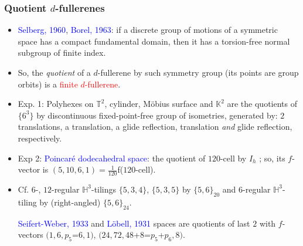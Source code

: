 \documentclass{beamer}
\begin{document}
\begin{frame}\frametitle{Quotient $d$-fullerenes}
\begin{itemize}
\vspace{-2mm}
\item
\textcolor{blue}{Selberg, 1960}, \textcolor{blue}{Borel, 1963}: if a discrete group of 
motions of
a symmetric space has a compact fundamental domain, then it has a torsion-free
normal subgroup of finite index.
\item
So, the {\em quotient}  of a $d$-fullerene by 
such symmetry group   (its points are group orbits)  is a 
\textcolor{red}{finite $d$-fullerene}.
\pause 

\item Exp. 1:
Polyhexes on $\mathbb{T}^2$, cylinder, 
M\"obius surface and $\mathbb{K}^2$
are the quotients of $\{6^3\}$ by discontinuous  fixed-point-free
group of isometries, generated by: 
$2$ translations, a translation, a glide reflection, translation {\em and}  
glide reflection, respectively.
\pause

\item 
Exp 2: \textcolor{blue}{Poincar\'e dodecahedral space}: the quotient of $120$-cell  
by 
$I_h$ ; so, its $f$-vector is $(5,10, 6, 1)=\frac{1}{120}$f($120$-cell). 

\item 
Cf. $6$-, $12$-regular $\mathbb{H}^3$-tilings $\{5,3,4\}$, $\{5,3,5\}$  by
$\{5,6\}_{20}$  and $6$-regular $\mathbb{H}^3$-tiling by (right-angled) $\{5,6\}_{24}$.

\textcolor{blue}{Seifert-Weber, 1933} and  \textcolor{blue}{L\"obell, 1931}
spaces are quotients of last $2$ with $f$-vectors $(1,6, p_5$=$6,1)$, 
  $(24, 72, 48$+$8$=$p_5$+$p_6, 8)$.

\end{itemize}

\end{frame}














\end{document}

